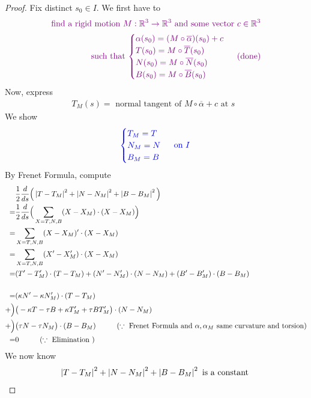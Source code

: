 \documentclass{report}
\begin{document}
\begin{proof}
Fix distinct $s_0\in I$. We first have to 
\begin{align*}
  \textcolor{violet}{\text{ find a rigid motion $M:\mathbb{R}^3\rightarrow \mathbb{R}^3$ and some vector $c\in\mathbb{R}^3$ }}\\
\textcolor{violet}{\text{ such that $\begin{cases}
  \alpha (s_0)=(M\circ \overline{\alpha })(s_0)+c\\
  T(s_0)=M\circ \overline{T}(s_0)\\
  N(s_0)=M\circ \overline{N}(s_0)\\
  B(s_0)=M\circ \overline{B}(s_0)
\end{cases}\textcolor{violet}{\text{ (done) }}$}}
\end{align*}
Now, express 
\begin{align*}
T_M(s)=\text{ normal tangent of }M\circ \overline{\alpha }+c\text{ at $s$ }
\end{align*}
We show 
\begin{align*}
\textcolor{blue}{\begin{cases}
  T_M=T\\
  N_M=N\\
  B_M=B
\end{cases}\text{ on $I$ }}
\end{align*}
By Frenet Formula, compute 
\begin{align*}
&\frac{1}{2}\frac{d}{ds}\Big(\left|T-T_M\right|^2+ \left|N-N_M\right|^2+\left|B-B_M\right|^2 \Big)\\
=&\frac{1}{2}\frac{d}{ds}\Big(\sum_{X=T,N,B} (X-X_M)\cdot (X-X_M)\Big)\\
=&\sum_{X=T,N,B} (X-X_M)'\cdot (X-X_M)\\
=&\sum_{X=T,N,B} (X'-X_M')\cdot (X-X_M)\\
=&(T'-T'_M)\cdot (T-T_M)+(N'-N'_M)\cdot (N-N_M)+(B'-B_M')\cdot (B-B_M)\\
 &\\
=&(\kappa N'-\kappa N'_M)\cdot (T-T_M)\\
+\Big)&\big(-\kappa T-\tau B+\kappa T_M'+\tau BT'_M \big)\cdot (N-N_M)\\
+\Big)& \big(\tau N-\tau N_M\big)\cdot (B-B_M)\hspace{1cm}(\because \text{ Frenet Formula and $\alpha ,\alpha _M$ same curvature and torsion})\\
=&0\hspace{1cm}(\because\text{ Elimination })
\end{align*}
We now know 
\begin{align*}
\abso{T-T_M}^2+\abso{N-N_M}^2+\abso{B-B_M}^2\text{ is a constant }

\end{align*}
\end{proof}
\end{document}
